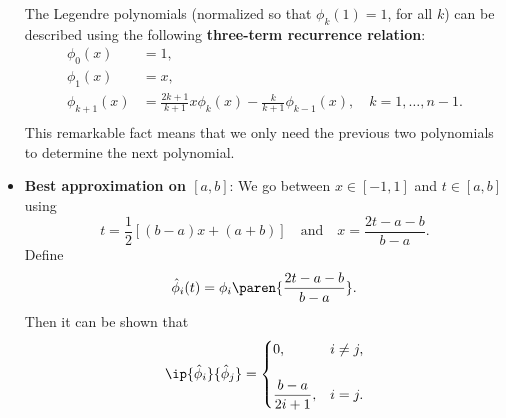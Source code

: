 \documentclass{report}
\begin{document}
\begin{itemize}
        The Legendre polynomials (normalized so that $\phi_k(1) = 1$, for all $k$) can be described using the following \textbf{three-term recurrence relation}:
        \begin{align*}
            \phi_0(x) &= 1,\\
            \phi_1(x) &= x,\\
            \phi_{k+1}(x) &= \frac{2k+1}{k+1} x \phi_k(x) - \frac{k}{k+1} \phi_{k-1}(x), \quad k = 1,\ldots,n-1.\\
        \end{align*}
        This remarkable fact means that we only need the previous two polynomials to determine the next polynomial.

    \item \textbf{Best approximation on $[a,b]$}:
        We go between $x \in [-1,1]$ and $t \in [a,b]$ using
        $$t = \frac{1}{2} \left[(b-a)x + (a+b)\right] \quad \text{and} \quad x = \frac{2t - a -b}{b-a}.$$
        Define 
        $$\hat\phi_i(t) = \phi_i\paren{\frac{2t - a -b}{b-a}}.$$
        Then it can be shown that
        $$\ip{\hat\phi_i}{\hat\phi_j} = 
        \begin{cases}
            0, & i \neq j,\\\\
            \displaystyle\frac{b-a}{2i+1}, & i=j.
        \end{cases}
        $$


     \end{itemize}

     \pagebreak 
\end{document}

